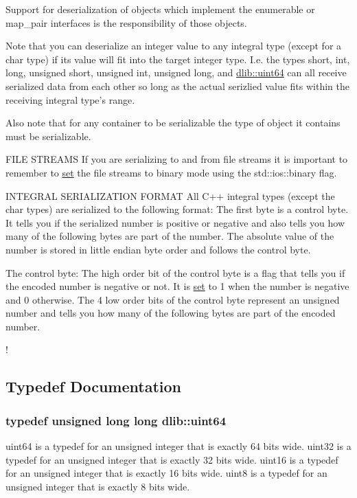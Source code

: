 Support for deserialization of objects which implement the enumerable or map\_\-pair interfaces is the responsibility of those objects.

Note that you can deserialize an integer value to any integral type (except for a char type) if its value will fit into the target integer type. I.e. the types short, int, long, unsigned short, unsigned int, unsigned long, and \hyperlink{namespacedlib_a61113f8b6b3e4ccb66deca9355c8f65d}{dlib::uint64} can all receive serialized data from each other so long as the actual serizlied value fits within the receiving integral type's range.

Also note that for any container to be serializable the type of object it contains must be serializable.

FILE STREAMS If you are serializing to and from file streams it is important to remember to \hyperlink{classdlib_1_1set}{set} the file streams to binary mode using the std::ios::binary flag.

INTEGRAL SERIALIZATION FORMAT All C++ integral types (except the char types) are serialized to the following format: The first byte is a control byte. It tells you if the serialized number is positive or negative and also tells you how many of the following bytes are part of the number. The absolute value of the number is stored in little endian byte order and follows the control byte.

The control byte: The high order bit of the control byte is a flag that tells you if the encoded number is negative or not. It is \hyperlink{classdlib_1_1set}{set} to 1 when the number is negative and 0 otherwise. The 4 low order bits of the control byte represent an unsigned number and tells you how many of the following bytes are part of the encoded number.

! 

\subsection{Typedef Documentation}
\hypertarget{namespacedlib_a61113f8b6b3e4ccb66deca9355c8f65d}{
\subsubsection[{uint64}]{\setlength{\rightskip}{0pt plus 5cm}typedef unsigned long long {\bf dlib::uint64}}}
\label{namespacedlib_a61113f8b6b3e4ccb66deca9355c8f65d}
uint64 is a typedef for an unsigned integer that is exactly 64 bits wide. uint32 is a typedef for an unsigned integer that is exactly 32 bits wide. uint16 is a typedef for an unsigned integer that is exactly 16 bits wide. uint8 is a typedef for an unsigned integer that is exactly 8 bits wide.


